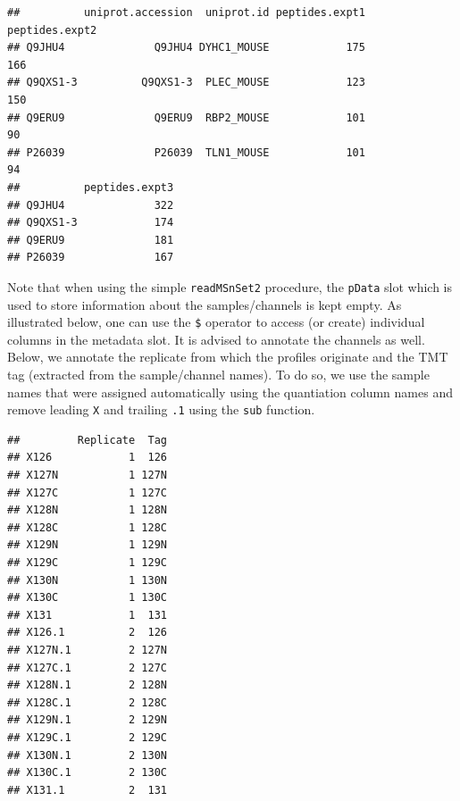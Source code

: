 \begin{knitrout}
\begin{kframe}
\begin{alltt}
\end{alltt}
\begin{verbatim}
##          uniprot.accession  uniprot.id peptides.expt1 peptides.expt2
## Q9JHU4              Q9JHU4 DYHC1_MOUSE            175            166
## Q9QXS1-3          Q9QXS1-3  PLEC_MOUSE            123            150
## Q9ERU9              Q9ERU9  RBP2_MOUSE            101             90
## P26039              P26039  TLN1_MOUSE            101             94
##          peptides.expt3
## Q9JHU4              322
## Q9QXS1-3            174
## Q9ERU9              181
## P26039              167
\end{verbatim}
\end{kframe}
\end{knitrout}

Note that when using the simple \texttt{readMSnSet2} procedure, the
\texttt{pData} slot which is used to store information about the
samples/channels is kept empty. As illustrated below, one can use the
\texttt{\$} operator to access (or create) individual columns in the
metadata slot. It is advised to annotate the channels as well. Below,
we annotate the replicate from which the profiles originate and the
TMT tag (extracted from the sample/channel names). To do so, we use
the sample names that were assigned automatically using the
quantiation column names and remove leading \texttt{X} and trailing
\texttt{.1} using the \texttt{sub} function.

\begin{knitrout}
\color{fgcolor}\begin{kframe}
\begin{alltt}
\hlopt{$} \hlkwb{<-} \hlstd{(}\hlopt{:}\hlstd{,}  \hlstd{=} \hlstd{)}
\hlopt{$} \hlkwb{<-} \hlstd{(}\hlstd{,} \hlstd{,} \hlstd{(}\hlstd{,} \hlstd{,} 
\end{alltt}
\begin{verbatim}
##         Replicate  Tag
## X126            1  126
## X127N           1 127N
## X127C           1 127C
## X128N           1 128N
## X128C           1 128C
## X129N           1 129N
## X129C           1 129C
## X130N           1 130N
## X130C           1 130C
## X131            1  131
## X126.1          2  126
## X127N.1         2 127N
## X127C.1         2 127C
## X128N.1         2 128N
## X128C.1         2 128C
## X129N.1         2 129N
## X129C.1         2 129C
## X130N.1         2 130N
## X130C.1         2 130C
## X131.1          2  131
\end{verbatim}
\end{kframe}
\end{knitrout}

